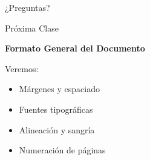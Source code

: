 \documentclass[aspectratio=169]{beamer}
\begin{document}
\begin{frame}[standout]
\Huge ¿Preguntas?
\end{frame}

\begin{frame}{Próxima Clase}
\begin{center}
\Large \textbf{Formato General del Documento}
\vspace{1cm}

Veremos:
\begin{itemize}
    \item Márgenes y espaciado
    \item Fuentes tipográficas
    \item Alineación y sangría
    \item Numeración de páginas
\end{itemize}
\end{center}
\end{frame}
\end{document}
